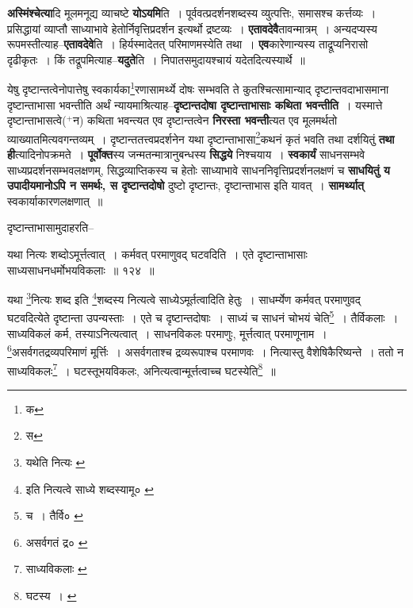 \documentclass[article,12pt,a4paper]{memoir}
\newcommand{\add}[1]{($^{+}$#1)}
\begin{document}
	  \endgroup
	

	  \pstart \textbf{अस्मिंश्चेत्या}दि मूलमनूद्य व्याचष्टे \textbf{योऽयमि}ति । पूर्ववत्प्रदर्शनशब्दस्य व्युत्पत्तिः, समासश्च कर्त्तव्यः । प्रसिद्धायां व्याप्तौ साध्या\leavevmode{}भावे हेतोर्निवृत्तिप्रदर्शन इत्यर्थो द्रष्टव्यः । \textbf{एतावदेवै}तावन्मात्रम् । अन्यदप्यस्य रूपमस्तीत्याह--\textbf{एतावदेवे}ति । हिर्यस्मादेतत् परिमाणमस्येति तथा । \textbf{एव}कारेणान्यस्य ताद्रूप्यनिरासो दृढीकृतः । किं तद्रूपमित्याह--\textbf{यदुते}ति । निपातसमुदायश्चायं यदेतदित्यस्यार्थे ॥
	\pend
      

	  \pstart येषु दृष्टान्तत्वेनोपात्तेषु स्वकार्यका\footnote{क}\-रणासामर्थ्ये दोषः सम्भवति ते कुतश्चित्सामान्याद् दृष्टान्तवदाभासमाना दृष्टान्ताभासा भवन्तीति अर्थं न्यायमाश्रित्याह--\textbf{दृष्टान्तदोषा दृष्टान्ताभासाः कथिता भवन्तीति} । यस्मात्ते दृष्टान्ताभासत्वे\add{न} कथिता भवन्त्यत एव दृष्टान्तत्वेन \textbf{निरस्ता भवन्ती}त्यत एव मूलमर्थतो व्याख्यातमित्यवगन्तव्यम् । दृष्टान्ततत्त्वप्रदर्शनेन यथा दृष्टान्ताभासा\footnote{स}\-कथनं कृतं भवति तथा दर्शयितुं \textbf{तथा ही}त्यादिनोपक्रमते । \textbf{पूर्वोक्त}स्य जन्मतन्मात्रानुबन्धस्य \textbf{सिद्धये} निश्चयाय । \textbf{स्वकार्यं} साधनसम्भवे साध्यप्रदर्शनसम्भवलक्षणम्, सिद्धव्याप्तिकस्य च हेतोः साध्याभावे साधननिवृत्तिप्रदर्शनलक्षणं च \textbf{साधयितुं य उपादीयमानोऽपि न समर्थः, स दृष्टान्तदोषो} दुष्टो दृष्टान्तः, दृष्टान्ताभास इति यावत् । \textbf{सामर्थ्यात्} स्वकार्याकारणलक्षणात् ॥
	\pend
	  \bigskip
	  \begingroup
	

	  \pstart दृष्टान्ताभासामुदाहरति--
	\pend
       
	  \bigskip
	  \begingroup
	

	  \pstart यथा नित्यः शब्दोऽमूर्त्तत्वात् । कर्मवत् परमाणुवद् घटवदिति । एते दृष्टान्ताभासाः साध्यसाधनधर्मोभयविकलाः ॥ १२४ ॥
	\pend
      
	  \endgroup
	 

	  \pstart यथा \footnote{यथेति नित्यः \cite{dp-msA} \cite{dp-msB} \cite{dp-edP} \cite{dp-edH} \cite{dp-edE} \cite{dp-edN}}\-नित्यः शब्द इति \footnote{इति नित्यत्वे साध्ये शब्दस्यामू० \cite{dp-msD} \cite{dp-msB}}\-शब्दस्य नित्यत्वे साध्येऽमूर्तत्वादिति हेतुः । साधर्म्येण कर्मवत् परमाणुवद् घटवदित्येते दृष्टान्ता उपन्यस्ताः । एते च दृष्टान्तदोषाः । साध्यं च साधनं चोभयं चेति\footnote{च । तैर्वि० \cite{dp-msC}} । तैर्विकलाः । साध्यविकलं कर्म, तस्याऽनित्यत्वात् । साधनविकलः परमाणुः, मूर्त्तत्वात् परमाणूनाम । \footnote{असर्वगतं द्र० \cite{dp-msA} \cite{dp-msB} \cite{dp-edP} \cite{dp-edH} \cite{dp-edN}}\-असर्वगतद्रव्यपरिमाणं मूर्त्तिः । असर्वगताश्च द्रव्यरूपाश्च परमाणवः । नित्यास्तु वैशेषिकैरिष्यन्ते । ततो न साध्यविकलः\footnote{साध्यविकलाः \cite{dp-msC} \cite{dp-msD}} । घटस्तूभयविकलः, अनित्यत्वान्मूर्त्तत्वाच्च घटस्येति\footnote{घटस्य । \cite{dp-edE}} ॥
	\pend
       
\end{document}
